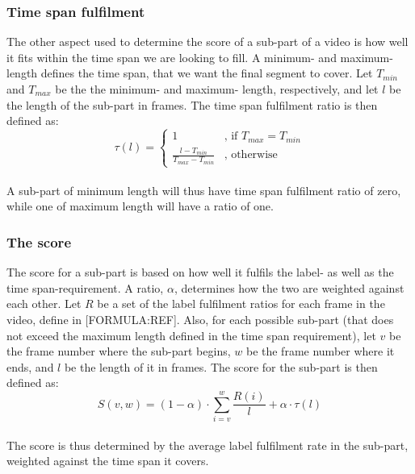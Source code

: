 \subsubsection{Time span fulfilment}
%
The other aspect used to determine the score of a sub-part of a video is how well it fits within the time span we are looking to fill. A minimum- and maximum- length defines the time span, that we want the final segment to cover. Let $T_{min}$ and $T_{max}$ be the the minimum- and maximum- length, respectively, and let $l$ be the length of the sub-part in frames. The time span fulfilment ratio is then defined as:\\
%
\begin{equation}
\tau(l) =
\begin{cases}
1 & \text{, if } T_{max} = T_{min}\\
\frac{l-T_{min}}{T_{max}-T_{min}} &  \text{, otherwise}
\end{cases}
\end{equation} 
%
\\
%
A sub-part of minimum length will thus have time span fulfilment ratio of zero, while one of maximum length will have a ratio of one. 
%
\subsubsection{The score}
%
The score for a sub-part is based on how well it fulfils the label- as well as the time span-requirement. A ratio, $\alpha$, determines how the two are weighted against each other. Let $R$ be a set of the label fulfilment ratios for each frame in the video, define in [FORMULA:REF]. Also, for each possible sub-part (that does not exceed the maximum length defined in the time span requirement), let $v$ be the frame number where the sub-part begins, $w$ be the frame number where it ends, and $l$ be the length of it in frames. The score for the sub-part is then defined as:\\
%
\begin{equation}
S(v,w) =(1-\alpha) \cdot \sum_{i=v}^{w} \frac{R(i)}{l} + \alpha \cdot \tau(l)
\end{equation}
%
%
%
%
\\
%
The score is thus determined by the average label fulfilment rate in the sub-part, weighted against the time span it covers.
%
